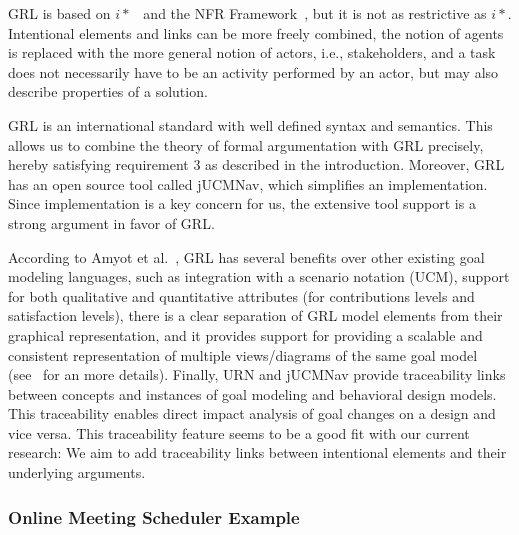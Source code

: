 GRL is based on $i*$~\cite{Yu:1997:TMR:827255.827807} and the NFR Framework~\cite{chung2012non}, but it is not as restrictive as $i*$. Intentional elements and links can be more freely combined, the notion of agents is replaced with the more general notion of actors, i.e., stakeholders, and a task does not necessarily have to be an activity performed by an actor, but may also describe properties of a solution.


GRL is an international standard with well defined syntax and semantics. This allows us to combine the theory of formal argumentation with GRL precisely, hereby satisfying requirement 3 as described in the introduction. Moreover, GRL has an open source tool called jUCMNav, which simplifies an implementation. Since implementation is a key concern for us, the extensive tool support is a strong argument in favor of GRL.  

According to Amyot et al.~\cite{amyot2009lightweight}, GRL has several benefits over other existing goal modeling languages, such as integration with a scenario notation (UCM), support for both qualitative and quantitative attributes (for contributions levels and satisfaction levels), there is a clear separation of GRL model elements from their graphical representation, and it provides support for providing a scalable and consistent representation of multiple views/diagrams of the same goal model (see~\cite[Ch.2]{Ghanavati2013} for an more details). Finally, URN and jUCMNav provide traceability links between concepts and instances of goal modeling and behavioral design models. This traceability enables direct impact analysis of goal changes on a design and vice versa. This traceability feature seems to be a good fit with our current research: We aim to add traceability links between intentional elements and their underlying arguments. 


\subsubsection{Online Meeting Scheduler Example}
\label{sect:background:casestudy}


